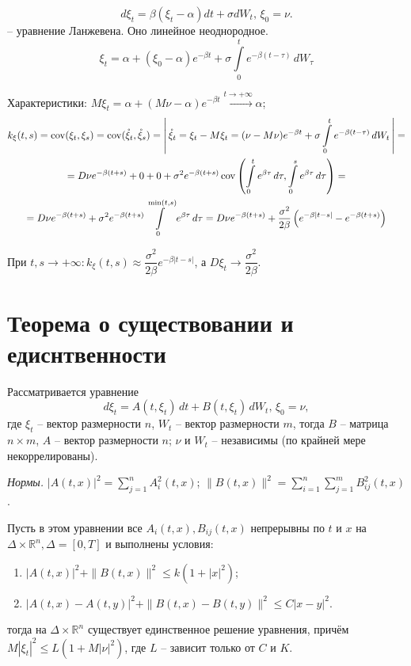 \begin{ex}
  \[
    d\xi_t = \beta(\xi_t - \alpha) dt + \sigma dW_t, \, \xi_0 = \nu.
  \]
  -- уравнение Ланжевена.
  Оно линейное неоднородное.
  \[
    \xi_t = \alpha + (\xi_0-\alpha) e^{-\beta t} +
    \sigma \int\limits_0^t e^{-\beta (t-\tau)} \, dW_\tau
  \]

  Характеристики:
  $M\xi_t = \alpha + (M\nu - \alpha) e^{-\beta t} \overset{t \to +\infty}{\to} \alpha$;
  \begin{multline*}
    k_\xi(t, s) = \operatorname{cov}(\xi_t, \xi_s) = \operatorname{cov}( \mathring{\xi}_t, \mathring{\xi}_s ) = 
    \left|\, \mathring{\xi}_t = \xi_t - M\xi_t = (\nu - M\nu) e^{-\beta t} + \sigma \int\limits_0^t e^{-\beta (t - \tau)} \, dW_t \,\right| = \\
    = D\nu e^{-\beta (t+s)} + 0 + 0 + \sigma^2 e^{-\beta (t+s)} \operatorname{cov} \left( \int\limits_0^t e^{\beta \tau} \, d\tau, \int\limits_0^s e^{\beta \tau} \, d\tau \right) = \\
    = D\nu e^{-\beta (t+s)} + \sigma^2 e^{-\beta (t+s)} \int\limits_0^{\min(t, s)} e^{\beta \tau} \, d\tau =
    D\nu e^{-\beta (t+s)} + \dfrac{\sigma^2}{2\beta} \left( e^{-\beta |t-s|} - e^{-\beta (t+s)} \right)  
  \end{multline*}

  При $t, s \to +\infty : k_\xi(t, s) \approx \dfrac{\sigma^2}{2\beta} e^{-\beta |t-s|}$,
  а $D\xi_t \to \dfrac{\sigma^2}{2\beta}$.
\end{ex}

\section{Теорема о существовании и едиснтвенности}

Рассматривается уравнение
\[
  d\xi_t = A(t, \xi_t) \, dt + B(t, \xi_t) \, dW_t, \, \xi_0 = \nu,
\]
где $\xi_t$ -- вектор размерности $n$, $W_t$ -- вектор размерности $m$, тогда $B$ -- матрица $n \times m$, $A$ -- вектор размерности $n$;
$\nu$ и $W_t$ -- независимы (по крайней мере некоррелированы).

\textit{Нормы. } $|A(t, x)|^2 = \sum_{j=1}^n A_i^2 (t, x)$;
$\| B(t, x) \|^2 = \sum_{i=1}^n \sum_{j=1}^m B_{ij}^2(t, x)$.


\begin{theorem}\label{theorem:existance_1}
  Пусть в этом уравнении все $A_i(t, x), B_{ij}(t, x)$ непрерывны по $t$ и $x$ на $\Delta \times \mathbb{R}^n, \Delta = [0, T]$ и выполнены условия:
  \begin{enumerate}
    \item $|A(t, x)|^2 + \|B(t, x)\|^2 \leqslant k(1 + |x|^2)$;
    \item $|A(t, x) - A(t, y)|^2 + \| B(t, x) - B(t, y) \|^2 \leqslant C |x-y|^2$.
  \end{enumerate}
  тогда на $\Delta \times \mathbb{R}^n$ существует единственное решение уравнения,
  причём $M|\xi_t|^2 \leqslant L (1 + M|\nu|^2)$, где $L$ -- зависит только от $C$ и $K$.
\end{theorem}


